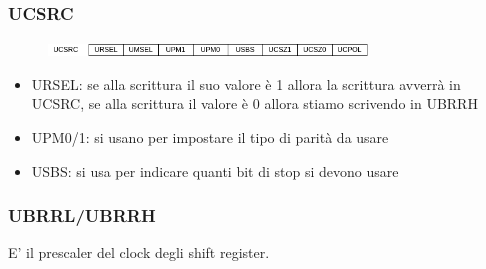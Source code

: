 \subsubsection{UCSRC}
\begin{figure}[H]
    \centering
    \includegraphics[width=320px]{images/22_USART/UCSRC.png}
\end{figure}
\begin{itemize}
    \item URSEL: se alla scrittura il suo valore è 1 allora la scrittura avverrà in UCSRC, se alla scrittura il valore è 0 allora stiamo scrivendo in UBRRH
    \item UPM0/1: si usano per impostare il tipo di parità da usare
    \item USBS: si usa per indicare quanti bit di stop si devono usare
\end{itemize}

\subsubsection{UBRRL/UBRRH}
E' il prescaler del clock degli shift register.


